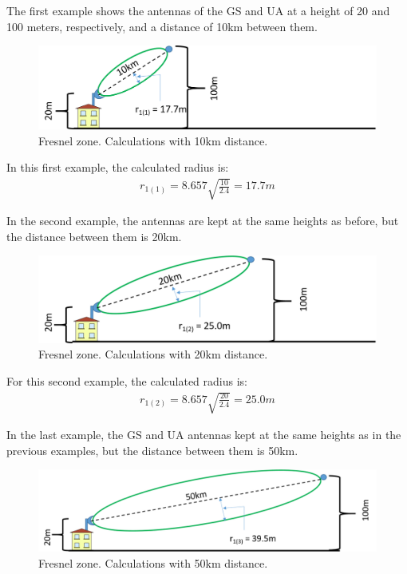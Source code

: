 The first example shows the antennas of the GS and UA at a height of 20 and 100 meters, respectively, and a distance of 10km between them.

\begin{figure}[H]
	\centering
	\includegraphics[scale=0.50]{figures/fresnel_10km.png}
	\caption{Fresnel zone. Calculations with 10km distance.}
	\label{fig:fresnel_zones_10km}
\end{figure}  

In this first example, the calculated radius is:
\begin{align*}
r_{1(1)} = 8.657 \sqrt{\frac{10}{2.4}} = 17.7m
\end{align*}

In the second example, the antennas are kept at the same heights as before, but the distance between them is 20km.

\begin{figure}[H]
	\centering
	\includegraphics[scale=0.50]{figures/fresnel_20km.png}
	\caption{Fresnel zone. Calculations with 20km distance.}
	\label{fig:fresnel_zones_20km}
\end{figure}  

For this second example, the calculated radius is:
\begin{align*}
r_{1(2)} = 8.657 \sqrt{\frac{20}{2.4}} = 25.0m
\end{align*}

In the last example, the GS and UA antennas kept at the same heights as in the previous examples, but the distance between them is 50km.

\begin{figure}[H]
	\centering
	\includegraphics[scale=0.50]{figures/fresnel_50km.png}
	\caption{Fresnel zone. Calculations with 50km distance.}
	\label{fig:fresnel_zones_50km}
\end{figure}  

